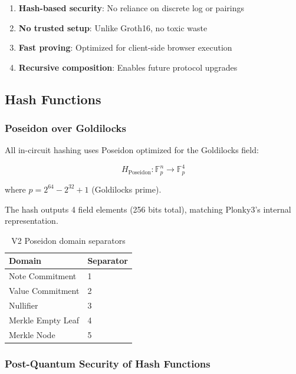 \documentclass[11pt,a4paper]{article}
\begin{document}
\begin{enumerate}
    \item \textbf{Hash-based security}: No reliance on discrete log or pairings
    \item \textbf{No trusted setup}: Unlike Groth16, no toxic waste
    \item \textbf{Fast proving}: Optimized for client-side browser execution
    \item \textbf{Recursive composition}: Enables future protocol upgrades
\end{enumerate}

\subsection{Hash Functions}

\subsubsection{Poseidon over Goldilocks}

All in-circuit hashing uses Poseidon optimized for the Goldilocks field:

\begin{equation}
H_{\text{Poseidon}}: \mathbb{F}_p^n \rightarrow \mathbb{F}_p^4
\end{equation}

where $p = 2^{64} - 2^{32} + 1$ (Goldilocks prime).

The hash outputs 4 field elements (256 bits total), matching Plonky3's internal representation.

\begin{table}[h]
\centering
\begin{tabular}{ll}
\toprule
Domain & Separator \\
\midrule
Note Commitment & 1 \\
Value Commitment & 2 \\
Nullifier & 3 \\
Merkle Empty Leaf & 4 \\
Merkle Node & 5 \\
\bottomrule
\end{tabular}
\caption{V2 Poseidon domain separators}
\end{table}

\subsubsection{Post-Quantum Security of Hash Functions}
\end{document}
